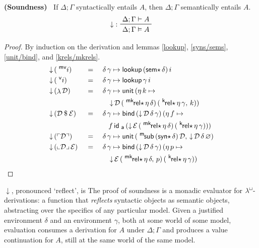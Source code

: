 \documentclass{entcs}
\numberwithin{equation}{thm}
\newcommand{\lambdabox}{\lambda^{\mkern-1mu\sq\mkern-2mu}}
\newcommand{\tsf}[1]{\textsf{\upshape{#1}}}
\newcommand{\stsf}[1]{\tsf{\small{#1}}}
\renewcommand{\:}{\mathrel{:}}
\newcommand{\tyrule}[1]{\prftree[l]{${#1} \:\,$}}
\newcommand{\0}{\varnothing}
\newcommand{\sq}{\Box}
\newcommand{\D}{\mathcal{D}}
\newcommand{\E}{\mathcal{E}}
\renewcommand{\e}{\mathrel{\vdash}}
\newcommand{\mvar}{\operatorname{^{\stsf{mv}\mkern-4mu}}}
\newcommand{\var}{\operatorname{^{\stsf{v}\mkern-4mu}}}
\newcommand{\lam}{\operatorname{\lambda}}
\newcommand{\app}{\mathbin{\$}}
\newcommand{\quo}[1]{\mathopen{\ulcorner}{#1}\mathclose{\urcorner}}
\newcommand{\unq}[1]{\mathopen{\llcorner}{#1}\mathclose{\lrcorner}\,}
\newcommand{\msub}{\operatorname{^{\stsf{m}\mkern-2mu}\tsf{sub}}}
\newcommand{\ida}{\operatorname{\tsf{id}_{\stsf{a}}}}
\newcommand{\syns}{\operatorname{\tsf{syn}\star}}
\newcommand{\sems}{\operatorname{\tsf{sem}\star}}
\newcommand{\eeq}{\mathrel{\vDash}}
\newcommand{\krels}{\operatorname{^{\stsf{k}\mkern-2mu}\tsf{rel}\star}}
\newcommand{\mkrels}{\operatorname{^{\stsf{mk}\mkern-2mu}\tsf{rel}\star}}
\newcommand{\unit}{\operatorname{\tsf{unit}}}
\newcommand{\bind}{\operatorname{\tsf{bind}}}
\newcommand{\lookup}{\operatorname{\tsf{lookup}}}
\newcommand{\reflect}{\operatorname{\downarrow}}
\begin{document}
\begin{theorem}
  \normalshape
  \textbf{(Soundness)\ }
  \label{reflect}
  If $\Delta; \Gamma$ syntactically entails $A$, then $\Delta; \Gamma$ semantically entails $A$.
  \begin{gather*}
    \tyrule{\reflect}{\Delta; \Gamma \e A}{\Delta; \Gamma \eeq A}
  \end{gather*}
  \itshape
  \begin{proof}
    \normalshape
    By induction on the derivation and lemmas \ref{lookup}, \ref{syns/sems}, \ref{unit/bind}, and \ref{krels/mkrels}.
    \begin{alignat}{3}
      \label{reflect.mvar} & \reflect\, (\mvar i)    \,&&=\, &&\,\delta\, \gamma \mapsto \lookup\, (\sems \delta)\, i\\
      \label{reflect.var}  & \reflect\, (\var i)     \,&&=\, &&\,\delta\, \gamma \mapsto \lookup \gamma\, i\\
      \label{reflect.lam}  & \reflect\, (\lam \D)    \,&&=\, &&\,\delta\, \gamma \mapsto \unit\, (\eta\,k \mapsto\\
      \nonumber            & && && \quad \reflect \D\, (\mkrels \eta\, \delta)\, (\krels \eta\, \gamma,\, k))\\
      \label{reflect.app}  & \reflect\, (\D \app \E) \,&&=\, &&\,\delta\, \gamma \mapsto \bind\, (\reflect \D\, \delta\, \gamma)\, (\eta\,f \mapsto\\
      \nonumber            & && && \quad f \ida\, (\reflect \E\, (\mkrels \eta\, \delta)\, (\krels \eta\, \gamma)))\\
      \label{reflect.quo}  & \reflect\, (\quo{\D})   \,&&=\, &&\,\delta\, \gamma \mapsto \unit\, (\msub\, (\syns \delta)\, \D,\, \reflect \D\, \delta\, \0)\\
      \label{reflect.unq}  & \reflect\, (\unq{\D}\E) \,&&=\, &&\,\delta\, \gamma \mapsto \bind\, (\reflect \D\, \delta\, \gamma)\, (\eta\,p \mapsto\\
      \nonumber            & && && \quad \reflect \E\, (\mkrels \eta\, \delta,\, p)\, (\krels \eta\, \gamma))
    \end{alignat}
  \end{proof}
\end{theorem}
\noindent
$\reflect$, pronounced `reflect', is The proof of soundness is a monadic evaluator for $\lambdabox$-derivations: a function that \emph{reflects} syntactic objects as semantic objects, abstracting over the specifics of any particular model.  Given a justified environment $\delta$ and an environment $\gamma$, both at some world of some model, evaluation consumes a derivation for $A$ under $\Delta; \Gamma$ and produces a value continuation for $A$, still at the same world of the same model.
\end{document}
